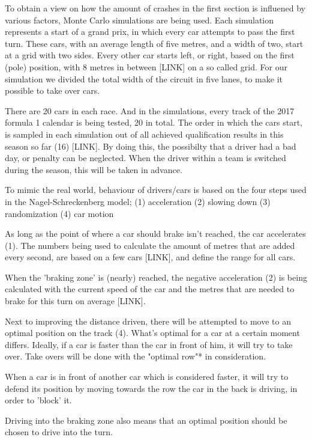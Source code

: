 To obtain a view on how the amount of crashes in the first section is influened by various factors, Monte Carlo simulations are being used. Each simulation represents a start of a grand prix, in which every car attempts to pass the first turn. These cars, with an average length of five metres, and a width of two, start at a grid with two sides. Every other car starts left, or right, based on the first (pole) position, with 8 metres in between [LINK] on a so called grid. For our simulation we divided the total width of the circuit in five lanes, to make it possible to take over cars.

There are 20 cars in each race. And in the simulations, every track of the 2017 formula 1 calendar is being tested, 20 in total. The order in which the cars start, is sampled in each simulation out of all achieved qualification results in this season so far (16) [LINK]. By doing this, the possibilty that a driver had a bad day, or penalty can be neglected. When the driver within a team is switched during the season, this will be taken in advance.

To mimic the real world, behaviour of drivers/cars is based on the four steps used in the Nagel-Schreckenberg model;
(1) acceleration
(2) slowing down
(3) randomization
(4) car motion

As long as the point of where a car should brake isn't reached, the car accelerates (1). The numbers being used to calculate the amount of metres that are added every second, are based on a few cars [LINK], and define the range for all cars.

When the 'braking zone' is (nearly) reached, the negative acceleration (2) is being calculated with the current speed of the car and the metres that are needed to brake for this turn on average [LINK].

Next to improving the distance driven, there will be attempted to move to an optimal position on the track (4). What's optimal for a car at a certain moment differs. Ideally, if a car is faster than the car in front of him, it will try to take over. Take overs will be done with the "optimal row"* in consideration.

When a car is in front of another car which is considered faster, it will try to defend its position by moving towards the row the car in the back is driving, in order to 'block' it.

Driving into the braking zone also means that an optimal position should be chosen to drive into the turn.

